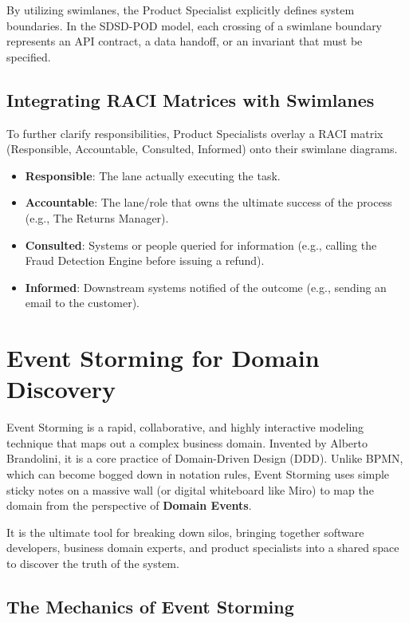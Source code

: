 \documentclass[
  11pt,
  openany,
  oneside]{book}
\providecommand{\tightlist}{%
  \setlength{\itemsep}{0pt}\setlength{\parskip}{0pt}}
\begin{document}
By utilizing swimlanes, the Product Specialist explicitly defines system
boundaries. In the SDSD-POD model, each crossing of a swimlane boundary
represents an API contract, a data handoff, or an invariant that must be
specified.

\subsection{Integrating RACI Matrices with
Swimlanes}\label{integrating-raci-matrices-with-swimlanes}

To further clarify responsibilities, Product Specialists overlay a RACI
matrix (Responsible, Accountable, Consulted, Informed) onto their
swimlane diagrams.

\begin{itemize}
\tightlist
\item
  \textbf{Responsible}: The lane actually executing the task.
\item
  \textbf{Accountable}: The lane/role that owns the ultimate success of
  the process (e.g., The Returns Manager).
\item
  \textbf{Consulted}: Systems or people queried for information (e.g.,
  calling the Fraud Detection Engine before issuing a refund).
\item
  \textbf{Informed}: Downstream systems notified of the outcome (e.g.,
  sending an email to the customer).
\end{itemize}

\bigskip

\section{Event Storming for Domain
Discovery}\label{event-storming-for-domain-discovery}

Event Storming is a rapid, collaborative, and highly interactive
modeling technique that maps out a complex business domain. Invented by
Alberto Brandolini, it is a core practice of Domain-Driven Design (DDD).
Unlike BPMN, which can become bogged down in notation rules, Event
Storming uses simple sticky notes on a massive wall (or digital
whiteboard like Miro) to map the domain from the perspective of
\textbf{Domain Events}.

It is the ultimate tool for breaking down silos, bringing together
software developers, business domain experts, and product specialists
into a shared space to discover the truth of the system.

\subsection{The Mechanics of Event
Storming}\label{the-mechanics-of-event-storming}
\end{document}
